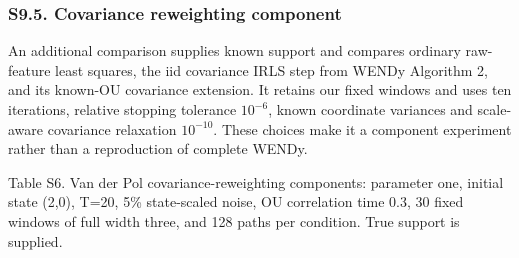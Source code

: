 \documentclass[
  american,
  11pt,
]{article}
\begin{document}
\subsubsection{S9.5. Covariance reweighting
component}\label{s9.5.-covariance-reweighting-component}

An additional comparison supplies known support and compares ordinary
raw-feature least squares, the iid covariance IRLS step from WENDy
Algorithm 2, and its known-OU covariance extension. It retains our fixed
windows and uses ten iterations, relative stopping tolerance
\(10^{-6}\), known coordinate variances and scale-aware covariance
relaxation \(10^{-10}\). These choices make it a component experiment
rather than a reproduction of complete WENDy.

\begin{center}
\begin{minipage}{\linewidth}
Table S6. Van der Pol covariance-reweighting components: parameter one,
initial state (2,0), T=20, 5\% state-scaled noise, OU correlation time
0.3, 30 fixed windows of full width three, and 128 paths per condition.
True support is supplied.


\end{minipage}
\end{center}
\end{document}
